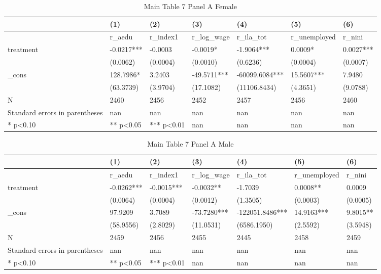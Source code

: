 \documentclass[11pt]{article}
\begin{document}
\clearpage
\begin{table}[!htbp]
\centering
\caption{Main Table 7 Panel A Female}
\label{tab:table7a_f}
\begin{tabular}{lllllll}
\toprule
 & (1) & (2) & (3) & (4) & (5) & (6) \\
\midrule
 & r\_aedu & r\_index1 & r\_log\_wage & r\_ila\_tot & r\_unemployed & r\_nini \\
treatment & -0.0217*** & -0.0003 & -0.0019* & -1.9064*** & 0.0009* & 0.0027*** \\
 & (0.0062) & (0.0004) & (0.0010) & (0.6236) & (0.0004) & (0.0007) \\
\_cons & 128.7986* & 3.2403 & -49.5711*** & -60099.6084*** & 15.5607*** & 7.9480 \\
 & (63.3739) & (3.9704) & (17.1082) & (11106.8434) & (4.3651) & (9.0788) \\
N & 2460 & 2456 & 2452 & 2457 & 2456 & 2460 \\
Standard errors in parentheses & nan & nan & nan & nan & nan & nan \\
* p<0.10 & ** p<0.05 & *** p<0.01 & nan & nan & nan & nan \\
\bottomrule
\end{tabular}

\end{table}

\clearpage
\begin{table}[!htbp]
\centering
\caption{Main Table 7 Panel A Male}
\label{tab:table7a_m}
\begin{tabular}{lllllll}
\toprule
 & (1) & (2) & (3) & (4) & (5) & (6) \\
\midrule
 & r\_aedu & r\_index1 & r\_log\_wage & r\_ila\_tot & r\_unemployed & r\_nini \\
treatment & -0.0262*** & -0.0015*** & -0.0032** & -1.7039 & 0.0008** & 0.0009 \\
 & (0.0064) & (0.0004) & (0.0012) & (1.3505) & (0.0003) & (0.0005) \\
\_cons & 97.9209 & 3.7089 & -73.7280*** & -122051.8486*** & 14.9163*** & 9.8015** \\
 & (58.9556) & (2.8029) & (11.0531) & (6586.1950) & (2.5592) & (3.5948) \\
N & 2459 & 2456 & 2455 & 2445 & 2458 & 2459 \\
Standard errors in parentheses & nan & nan & nan & nan & nan & nan \\
* p<0.10 & ** p<0.05 & *** p<0.01 & nan & nan & nan & nan \\
\bottomrule
\end{tabular}

\end{table}
\end{document}
